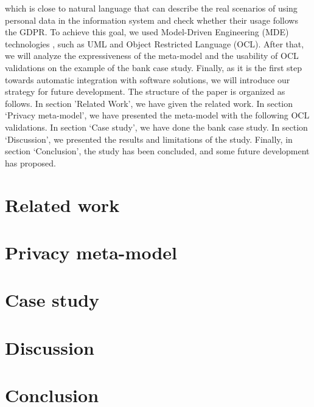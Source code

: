 \documentclass[11pt,english]{article}
\begin{document}
which is close to natural language that can describe the real scenarios of using personal data in the information system and check whether their usage follows the GDPR. To achieve this goal, we used Model-Driven Engineering (MDE) technologies \cite{mde}, such as UML \cite{uml} and Object Restricted Language (OCL). After that, we will analyze the expressiveness of the meta-model and the usability of OCL validations on the example of the bank case study. Finally, as it is the first step towards automatic integration with software solutions, we will introduce our strategy for future development. \newline The structure of the paper is organized as follows. In section 'Related Work', we have given the related work. In section ‘Privacy meta-model’, we have presented the meta-model with the following OCL validations. In section ‘Case study’, we have done the bank case study. In section ‘Discussion’,  we presented the results and limitations of the study. Finally, in section ‘Conclusion’, the study has been concluded, and some future development has proposed.
\section{Related work}
\section{Privacy meta-model}
\section{Case study}
\section{Discussion}
\section{Conclusion}
\printbibliography
\end{document}
